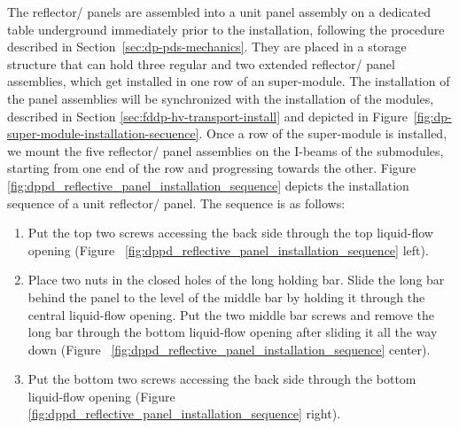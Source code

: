 The reflector/ panels are assembled into a unit panel assembly on a dedicated table underground immediately prior to the installation, following the procedure described in Section~\ref{sec:dp-pds-mechanics}. They are placed in a storage structure that can hold three regular and two extended reflector/ panel assemblies, which get installed in one row of an  super-module. The installation of the panel assemblies will be synchronized with the installation of the  modules, described in Section \ref{sec:fddp-hv-transport-install} and depicted in Figure~\ref{fig:dp-super-module-installation-secuence}. Once a row of the  super-module is installed, we mount the five reflector/ panel assemblies  on the  I-beams of the  submodules, starting from one end of the row and progressing towards the other. Figure \ref{fig:dppd_reflective_panel_installation_sequence} depicts the installation sequence of a unit reflector/ panel. The sequence is as follows: %

\begin{enumerate}
\item Put the top two screws accessing the back side through the top liquid-flow opening (Figure~ \ref{fig:dppd_reflective_panel_installation_sequence}  left).
\item Place two nuts in the closed holes of the long holding bar. Slide the long bar behind the panel to the level of the middle bar by holding it through the central liquid-flow opening. Put the two middle bar screws and remove the long bar through the bottom liquid-flow opening after sliding it all the way down (Figure~ \ref{fig:dppd_reflective_panel_installation_sequence} center).
\item Put the bottom two screws accessing the back side through the bottom liquid-flow opening (Figure~ \ref{fig:dppd_reflective_panel_installation_sequence}  right).
\end{enumerate}

